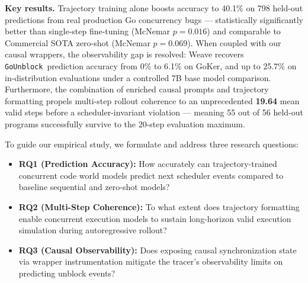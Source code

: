 \documentclass[10pt,conference]{IEEEtran}
\newcommand{\eunblock}{\texttt{GoUnblock}}
\begin{document}
\textbf{Key results.}
Trajectory training alone boosts accuracy to 40.1\% on 798 held-out
predictions from real production Go concurrency bugs — statistically
significantly better than single-step fine-tuning (McNemar $p{=}0.016$)
and comparable to Commercial SOTA zero-shot (McNemar $p{=}0.069$).
When coupled with our causal wrappers, the observability gap is resolved:
Weave recovers \eunblock\ prediction accuracy from 0\% to 6.1\% on GoKer, and up to 25.7\% on in-distribution evaluations under a controlled 7B base model comparison.
Furthermore, the combination of enriched causal prompts and trajectory formatting
propels multi-step rollout coherence to an unprecedented \textbf{19.64} mean valid steps
before a scheduler-invariant violation — meaning 55 out of 56 held-out programs successfully
survive to the 20-step evaluation maximum.

To guide our empirical study, we formulate and address three research questions:
\begin{itemize}
  \item \textbf{RQ1 (Prediction Accuracy):} How accurately can trajectory-trained concurrent code world models predict next scheduler events compared to baseline sequential and zero-shot models?
  \item \textbf{RQ2 (Multi-Step Coherence):} To what extent does trajectory formatting enable concurrent execution models to sustain long-horizon valid execution simulation during autoregressive rollout?
  \item \textbf{RQ3 (Causal Observability):} Does exposing causal synchronization state via wrapper instrumentation mitigate the tracer's observability limits on predicting unblock events?
\end{itemize}
\end{document}

